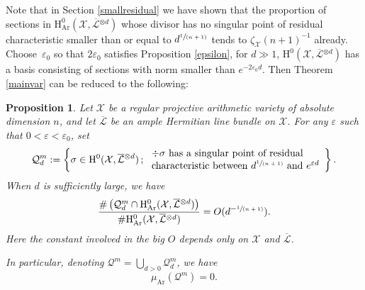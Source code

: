 \documentclass[JEP,XML,SOM,Unicode,published]{cedram}
\newcommand{\spfrac}[2]{\sfrac{#1}{(#2)}}
\let\epsilon\varepsilon
\newcommand{\sep}{\,;\,}
\theoremstyle{plain}
\newtheorem{prop}[thm]{Proposition}
\theoremstyle{definition}
\newcommand{\ho}{\mathrm{H}}
\newcommand{\X}{\mathcal{X}}
\newcommand{\Li}{\overline{\mathcal{L}}{}}
\begin{document}
Note that in Section \ref{smallresidual} we have shown that the proportion of sections in $\ho_{\mathrm{Ar}}^0(\X,\Li^{\otimes d})$ whose divisor has no singular point of residual characteristic smaller than or equal to $d^{\spfrac{1}{n+1}}$ tends to $\zeta_\X(n+1)^{-1}$ already. Choose~$\varepsilon_0$ so that $2\varepsilon_0$ satisfies Proposition \ref{epsilon}, \ie for $d\gg 1$, $\ho^0(\X,\Li{}^{\otimes d})$ has a basis consisting of sections with norm smaller than $e^{-2\varepsilon_0 d}$. Then Theorem \ref{mainvar} can be reduced to the following:
\begin{prop}\label{medsing}
Let $\X$ be a regular projective arithmetic variety of absolute dimension $n$, and let $\Li$ be an ample Hermitian line bundle on $\X$. For any $\varepsilon$ such that $0<\varepsilon<\epsilon_0$, set
\[
\mathcal{Q}_{d}^m:=\left\{ \sigma\in \ho^0(\X,\Li^{\otimes d})\sep \begin{array}{ll}
\div \sigma \text{ has a singular point of residual} \\
\text{characteristic between } d^{\spfrac{1}{n+1}} \text{ and } e^{\varepsilon d}
\end{array}\right\}.
\]
When $d$ is sufficiently large, we have
\[
\frac{\#\left(\mathcal{Q}_{d}^m\cap \ho^0_{\mathrm{Ar}}(\X, \overline{\mathcal{L}}{}^{\otimes d})\right)}{\#\ho^0_{\mathrm{Ar}}(\X, \overline{\mathcal{L}}{}^{\otimes d})} = O(d^{-\spfrac{1}{n+1}}).
\]
Here the constant involved in the big $O$ depends only on $\X$ and $\Li$.

In particular, denoting $\mathcal{Q}^m=\bigcup_{d>0}\mathcal{Q}_{d}^m$, we have
\[
\mu_{\mathrm{Ar}}(\mathcal{Q}^m)=0.
\]
\end{prop}
\end{document}
